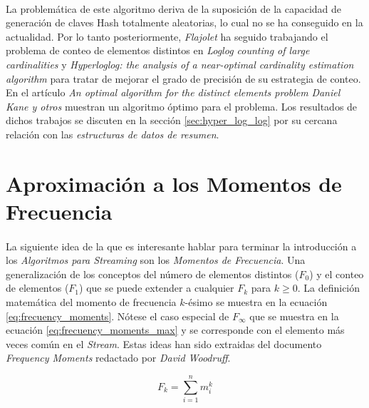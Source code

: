 \documentclass{subfiles}
\begin{document}
      \paragraph{}
      La problemática de este algoritmo deriva de la suposición de la capacidad de generación de claves Hash totalmente aleatorias, lo cual no se ha conseguido en la actualidad. Por lo tanto posteriormente, \emph{Flajolet} ha seguido trabajando el problema de conteo de elementos distintos en \emph{Loglog counting of large cardinalities} \cite{durand2003loglog} y \emph{Hyperloglog: the analysis of a near-optimal cardinality estimation algorithm} \cite{flajolet2007hyperloglog} para tratar de mejorar el grado de precisión de su estrategia de conteo. En el artículo \emph{An optimal algorithm for the distinct elements problem} \cite{kane2010optimal} \emph{Daniel Kane y otros} muestran un algoritmo óptimo para el problema. Los resultados de dichos trabajos se discuten en la sección \ref{sec:hyper_log_log} por su cercana relación con las \emph{estructuras de datos de resumen}.


    \section{Aproximación a los Momentos de Frecuencia}
    \label{sec:streaming_frecuency_moment_aproximation}

      \paragraph{}
      La siguiente idea de la que es interesante hablar para terminar la introducción a los \emph{Algoritmos para Streaming} son los \emph{Momentos de Frecuencia}. Una generalización de los conceptos del número de elementos distintos ($F_0$) y el conteo de elementos ($F_1$) que se puede extender a cualquier $F_k$ para $k \geq 0 $. La definición matemática del momento de frecuencia $k$-ésimo se muestra en la ecuación \eqref{eq:frecuency_moments}. Nótese el caso especial de $F_\infty$ que se muestra en la ecuación \eqref{eq:frecuency_moments_max} y se corresponde con el elemento más veces común en el \emph{Stream}. Estas ideas han sido extraidas del documento \emph{Frequency Moments} \cite{woodruff2009frequency} redactado por \emph{David Woodruff}.

      \begin{equation}
      \label{eq:frecuency_moments}
        F_k = \sum_{i=1}^n m_i^k
      \end{equation}
\end{document}
